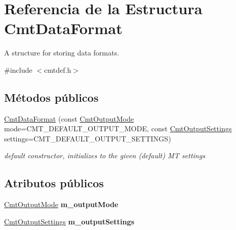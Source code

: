 \hypertarget{structCmtDataFormat}{\section{\-Referencia de la \-Estructura \-Cmt\-Data\-Format}
\label{structCmtDataFormat}
}


\-A structure for storing data formats.  




{\ttfamily \#include $<$cmtdef.\-h$>$}

\subsection*{\-Métodos públicos}
\begin{DoxyCompactItemize}
\item 
\hypertarget{structCmtDataFormat_abbf39ed525bac8dffa576d76c8644481}{\hyperlink{structCmtDataFormat_abbf39ed525bac8dffa576d76c8644481}{\-Cmt\-Data\-Format} (const \hyperlink{cmtdef_8h_a85df1cdea0bf11e38292e3cd5d69e747}{\-Cmt\-Output\-Mode} mode=\-C\-M\-T\-\_\-\-D\-E\-F\-A\-U\-L\-T\-\_\-\-O\-U\-T\-P\-U\-T\-\_\-\-M\-O\-D\-E, const \hyperlink{cmtdef_8h_a4125efede0d0948ee49291165a1d089b}{\-Cmt\-Output\-Settings} settings=\-C\-M\-T\-\_\-\-D\-E\-F\-A\-U\-L\-T\-\_\-\-O\-U\-T\-P\-U\-T\-\_\-\-S\-E\-T\-T\-I\-N\-G\-S)}\label{structCmtDataFormat_abbf39ed525bac8dffa576d76c8644481}

\begin{DoxyCompactList}\small\item\em default constructor, initializes to the given (default) \-M\-T settings \end{DoxyCompactList}\end{DoxyCompactItemize}
\subsection*{\-Atributos públicos}
\begin{DoxyCompactItemize}
\item 
\hypertarget{structCmtDataFormat_aaa37c5f7ef11bf65ff8b7c972af00ac7}{\hyperlink{cmtdef_8h_a85df1cdea0bf11e38292e3cd5d69e747}{\-Cmt\-Output\-Mode} {\bfseries m\-\_\-output\-Mode}}\label{structCmtDataFormat_aaa37c5f7ef11bf65ff8b7c972af00ac7}

\item 
\hypertarget{structCmtDataFormat_a0d55474589120999310688664287a3fb}{\hyperlink{cmtdef_8h_a4125efede0d0948ee49291165a1d089b}{\-Cmt\-Output\-Settings} {\bfseries m\-\_\-output\-Settings}}\label{structCmtDataFormat_a0d55474589120999310688664287a3fb}

\end{DoxyCompactItemize}


